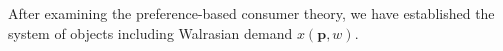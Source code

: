 After examining the preference-based consumer theory, we have established the system of objects including Walrasian demand $x(\mathbf{p},w)$. 

\sub